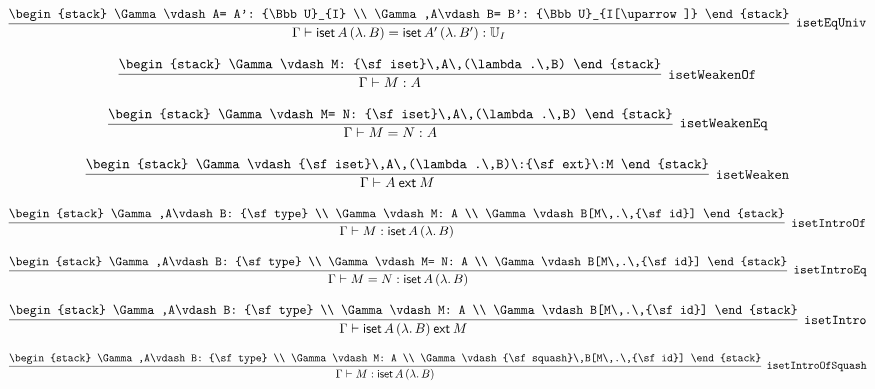 \[
\infer[{\tt isetEqUniv}]{\Gamma \vdash {\sf iset}\,A\,(\lambda .\,B)= {\sf iset}\,A'\,(\lambda .\,B'): {\Bbb U}_{I}}{
\begin{stack}
\Gamma \vdash A= A': {\Bbb U}_{I}
\\
\Gamma ,A\vdash B= B': {\Bbb U}_{I[\uparrow ]}
\end{stack}}
\]

\[
\infer[{\tt isetWeakenOf}]{\Gamma \vdash M: A}{
\begin{stack}
\Gamma \vdash M: {\sf iset}\,A\,(\lambda .\,B)
\end{stack}}
\]

\[
\infer[{\tt isetWeakenEq}]{\Gamma \vdash M= N: A}{
\begin{stack}
\Gamma \vdash M= N: {\sf iset}\,A\,(\lambda .\,B)
\end{stack}}
\]

\[
\infer[{\tt isetWeaken}]{\Gamma \vdash A\:{\sf ext}\:M}{
\begin{stack}
\Gamma \vdash {\sf iset}\,A\,(\lambda .\,B)\:{\sf ext}\:M
\end{stack}}
\]

\[
\infer[{\tt isetIntroOf}]{\Gamma \vdash M: {\sf iset}\,A\,(\lambda .\,B)}{
\begin{stack}
\Gamma ,A\vdash B: {\sf type}
\\
\Gamma \vdash M: A
\\
\Gamma \vdash B[M\,.\,{\sf id}]
\end{stack}}
\]

\[
\infer[{\tt isetIntroEq}]{\Gamma \vdash M= N: {\sf iset}\,A\,(\lambda .\,B)}{
\begin{stack}
\Gamma ,A\vdash B: {\sf type}
\\
\Gamma \vdash M= N: A
\\
\Gamma \vdash B[M\,.\,{\sf id}]
\end{stack}}
\]

\[
\infer[{\tt isetIntro}]{\Gamma \vdash {\sf iset}\,A\,(\lambda .\,B)\:{\sf ext}\:M}{
\begin{stack}
\Gamma ,A\vdash B: {\sf type}
\\
\Gamma \vdash M: A
\\
\Gamma \vdash B[M\,.\,{\sf id}]
\end{stack}}
\]

\[
\infer[{\tt isetIntroOfSquash}]{\Gamma \vdash M: {\sf iset}\,A\,(\lambda .\,B)}{
\begin{stack}
\Gamma ,A\vdash B: {\sf type}
\\
\Gamma \vdash M: A
\\
\Gamma \vdash {\sf squash}\,B[M\,.\,{\sf id}]
\end{stack}}
\]

